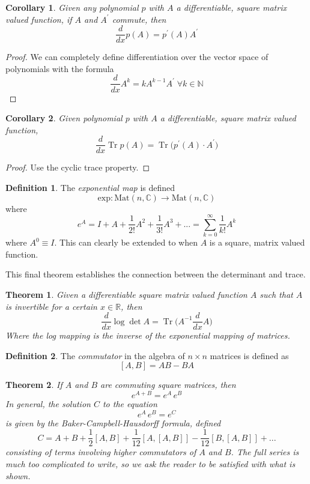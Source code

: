 \documentclass{article}
\DeclareMathOperator{\Tr}{Tr}
\newtheorem{theorem}{Theorem}[section]
\newtheorem{corollary}{Corollary}[theorem]
\theoremstyle{remark}
\theoremstyle{definition}
\newtheorem{definition}{Definition}[section]
\begin{document}
    \begin{corollary}
    Given any polynomial $p$ with $A$ a differentiable, square matrix valued function, if $A$ and $A^\prime$ commute, then 
    \[\frac{d}{d x} p(A) = p^\prime (A) A^\prime\]
    \end{corollary}
    \begin{proof}
    We can completely define differentiation over the vector space of polynomials with the formula
    \[\frac{d}{d x} A^k = k A^{k-1} A^\prime \; \forall k \in \mathbb{N}\]
    \end{proof}

    \begin{corollary}
    Given polynomial $p$ with $A$ a differentiable, square matrix valued function, 
    \[\frac{d}{d x} \Tr{p(A)} = \Tr{\big( p^\prime(A) \cdot A^\prime \big)}\]
    \end{corollary}
    \begin{proof}
    Use the cyclic trace property.
    \end{proof}

    \begin{definition}
    The \textit{exponential map} is defined
    \[\text{exp}: \text{Mat}(n, \mathbb{C}) \longrightarrow \text{Mat}(n, \mathbb{C})\]
    where 
    \[e^A = I + A + \frac{1}{2!} A^2 + \frac{1}{3!} A^3 + ... = \sum_{k=0}^\infty \frac{1}{k!} A^k\]
    where $A^0 \equiv I$. This can clearly be extended to when $A$ is a square, matrix valued function. 
    \end{definition}

    This final theorem establishes the connection between the determinant and trace. 

    \begin{theorem}
    Given a differentiable square matrix valued function $A$ such that $A$ is invertible for a certain $x \in \mathbb{R}$, then 
    \[\frac{d}{d x} \log{\det{A}} = \Tr \bigg( A^{-1} \frac{d}{d x} A \bigg)\]
    Where the log mapping is the inverse of the exponential mapping of matrices. 
    \end{theorem}

    \begin{definition}
    The \textit{commutator} in the algebra of $n \times n$ matrices is defined as 
    \[[A, B] = A B - B A\]
    \end{definition}

    \begin{theorem}
    If $A$ and $B$ are commuting square matrices, then 
    \[e^{A + B} = e^A \, e^B\]
    In general, the solution $C$ to the equation
    \[e^{A} \, e^B = e^C\]
    is given by the \textit{Baker-Campbell-Hausdorff formula}, defined
    \[C = A + B + \frac{1}{2}[A,B] + \frac{1}{12} [A,[A,B]] - \frac{1}{12} [B,[A,B]] + ...\]
    consisting of terms involving higher commutators of $A$ and $B$. The full series is much too complicated to write, so we ask the reader to be satisfied with what is shown. 
    \end{theorem}
\end{document}
